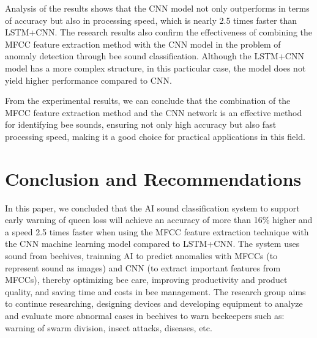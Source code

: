 \documentclass[twocolumn]{article}
\begin{document}
\vspace{-1em}
\begin{table}[H]
  \centering
  \caption{Comparison of accuracy and processing time between models}
  \label{tab:model_comparison}
\end{table}
\vspace{-1em}

Analysis of the results shows that the CNN model not only outperforms in terms of accuracy
but also in processing speed, which is nearly 2.5 times faster than LSTM+CNN. The research
results also confirm the effectiveness of combining the MFCC feature extraction method with
the CNN model in the problem of anomaly detection through bee sound classification.
Although the LSTM+CNN model has a more complex structure, in this particular case, the
model does not yield higher performance compared to CNN.

From the experimental results, we can conclude that the combination of the MFCC feature
extraction method and the CNN network is an effective method for identifying bee sounds,
ensuring not only high accuracy but also fast processing speed, making it a good choice
for practical applications in this field.

\section{Conclusion and Recommendations}
In this paper, we concluded that the AI sound classification system to support early
warning of queen loss will achieve an accuracy of more than 16\% higher and a speed
2.5 times faster when using the MFCC feature extraction technique with the CNN machine
learning model compared to LSTM+CNN. The system uses  sound from beehives, trainning AI
to predict anomalies with MFCCs (to represent sound as images) and CNN
(to extract important features from MFCCs), thereby optimizing bee care, improving
productivity and product quality, and saving time and costs in bee management. The
research group aims to continue researching, designing devices and developing equipment
to analyze and evaluate more abnormal cases in beehives to warn beekeepers such as:
warning of swarm division, insect attacks, diseases, etc.
\end{document}

